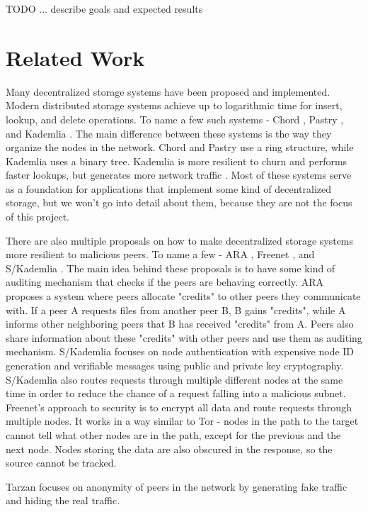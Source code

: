 \documentclass[ twoside,openright,titlepage,numbers=noenddot,headinclude,%
                footinclude=true,cleardoublepage=empty,abstractoff, %
                BCOR=5mm,paper=a4,fontsize=11pt,%
                ngerman,american,%
                ]{scrreprt}
\begin{document}
TODO ... describe goals and expected results 

\chapter{Related Work}

Many decentralized storage systems have been proposed and implemented.
Modern distributed storage systems achieve up to logarithmic time for insert, lookup, and delete operations.
To name a few such systems - Chord \cite{chord}, Pastry \cite{pastry}, and Kademlia \cite{kademlia}.
The main difference between these systems is the way they organize the nodes in the network.
Chord and Pastry use a ring structure, while Kademlia uses a binary tree.
Kademlia is more resilient to churn and performs faster lookups, but generates more network traffic \cite{kadvschordvspastry}.
Most of these systems serve as a foundation for applications that implement some kind of decentralized storage,
but we won't go into detail about them, because they are not the focus of this project.

There are also multiple proposals on how to make decentralized storage systems more resilient to malicious peers.
To name a few - ARA \cite{ara}, Freenet , and S/Kademlia \cite{skademlia}.
The main idea behind these proposals is to have some kind of auditing mechanism that checks if the peers are behaving correctly.
ARA proposes a system where peers allocate "credits" to other peers they communicate with.
If a peer A requests files from another peer B, B gains "credits", while A informs other neighboring peers
that B has received "credits" from A.
Peers also share information about these "credits" with other peers and use them as auditing mechanism.
S/Kademlia focuses on node authentication with expensive node ID generation and verifiable messages using
public and private key cryptography.
S/Kademlia also routes requests through multiple different nodes at the same time
in order to reduce the chance of a request falling into a malicious subnet.
Freenet's approach to security is to encrypt all data and route requests through multiple nodes.
It works in a way similar to Tor - nodes in the path to the target cannot tell what other nodes are in the path,
except for the previous and the next node.
Nodes storing the data are also obscured in the response, so the source cannot be tracked.

Tarzan focuses on anonymity of peers in the network by generating fake traffic and hiding the real traffic.
\end{document}
